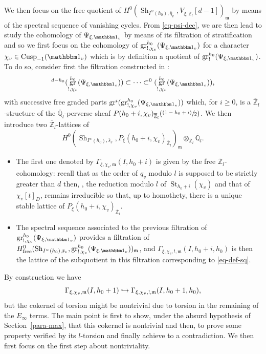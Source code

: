\documentclass[JEP,XML,SOM,Unicode,published]{cedram}
\let\mathds\mathbbm
\newcommand{\NoChangel}[1]{%
\expandafter\let\csname old\string#1\endcsname=#1
\let#1=\relax
\newcommand{#1}{\mathcode`l="716C\csname old\string#1\endcsname\mathcode`l="7160 }%
}
\def\hto{\mathrel{\lhook\joinrel\to}}
\newcommand{\psfrac}[2]{\sfrac{(#1)}{#2}}
\newcommand{\free}{\mathrm{free}}
\theoremstyle{plain}
\theoremstyle{definition}
\numberwithin{equation}{subsection}
\newcommand\Qm{{\mathbb Q}}
\newcommand\Zm{{\mathbb Z}}
\DeclareMathOperator{\sh}{Sh}
\DeclareMathOperator{\cusp}{Cusp}
\DeclareMathOperator{\st}{St}
\DeclareMathOperator{\gr}{gr}
\DeclareMathOperator{\Fil}{Fil}\NoChangel{\Fil}
\let \oo=\infty
\begin{document}
We then focus on the free quotient of
$H^0(\sh_{I^w(h_0),\bar \eta_v},V_{\xi,\overline \Zm_l}[d-1])_{\mathfrak m}$
by means of the spectral sequence of vanishing cycles. From \eqref{eq-psi-dec},
we are then lead to study the cohomology of $\Psi_{\xi,\mathds 1_v}$
by means of its filtration of stratification and so we first focus
on the cohomology of $\gr^{h_0}_{!,\chi_v}(\Psi_{\xi,\mathds 1_v})$ for a character
$\chi_v \in \cusp_{-1}(\mathds 1_v)$ which is by definition a quotient of
$\gr^{h_0}_{!}(\Psi_{\xi,\mathds 1_v})$.
To do so, consider first the filtration constructed in \cite{boyer-torsion}:
\[
\Fil^{d-h_0} (\gr^{h_0}_{!,\chi_v}(\Psi_{\xi,\mathds 1_v})) \subset
\cdots \subset \Fil^0(\gr^{h_0}_{!,\chi_v}(\Psi_{\xi,\mathds 1_v})),
\]
with successive free graded parts
$\gr^i(\gr^{h_0}_{!,\chi_v}(\Psi_{\xi,\mathds 1_v}))$ which, for $i \geq 0$,
is a $\overline \Zm_l$-structure of
the $\overline \Qm_l$-perverse sheaf $P(h_0+i,\chi_v)_{\overline \Zm_l}(\psfrac{1-h_0+i}{2})$.
We then introduce two $\overline \Zm_l$-lattices of
\begin{equation} \label{eq-def-sq}
H^0(\sh_{I^w(h_0),\bar s_v},P_\xi(h_0+i,\chi_v)_{\overline \Zm_l})_{\mathfrak m}
\otimes_{\overline \Zm_l} \overline \Qm_l.
\end{equation}
\begin{itemize}
\item The first one denoted by $\Gamma_{\xi,\chi_v,\mathfrak m}(I,h_0+i)$ is given by the free $\overline \Zm_l$-cohomology: recall that as the order of $q_v$
modulo $l$
is supposed to be strictly greater than $d$ then, \cf \cite{boyer-repmodl},
the reduction modulo $l$ of
$\st_{h_0+i}(\chi_v)$ and that of $\chi_v[t]_D$,
remains irreducible so that, up to homothety, there is a unique
stable lattice of $P_\xi(h_0+i,\chi_v)_{\overline \Zm_l}$.

\item The spectral sequence associated to the previous filtration of
$\gr^{h_0}_{!,\chi_v}(\Psi_{\xi,\mathds 1_v})$ provides a filtration of $H^0_{\free}
(\sh_{I^w(h_0),\bar s_v},\gr^{h_0}_{!,\chi_v}(\Psi_{\xi,\mathds 1_v}))_{\mathfrak m}$,
and $\Gamma_{\xi,\chi_v,!,\mathfrak m}(I,h_0+i,h_0)$ is then the lattice of the
subquotient in this filtration corresponding to \eqref{eq-def-sq}.
\end{itemize}

By construction we have\vspace*{-3pt}
\begin{equation} \label{eq-T}
\Gamma_{\xi,\chi_v,\mathfrak m}(I,h_0+1)
\hto \Gamma_{\xi,\chi_v,!,\mathfrak m}(I,h_0+1,h_0),
\end{equation}
but the cokernel of torsion might be nontrivial due to torsion
in the remaining of the $E_\oo$ terms. The main point is first to show,
under the absurd hypothesis of Section~\ref{para-max}, that this cokernel is nontrivial and
then, to prove some property verified by its $l$\nobreakdash-tor\-sion and finally achieve to a
contradiction. We then first focus on the first step about nontriviality.
\end{document}
